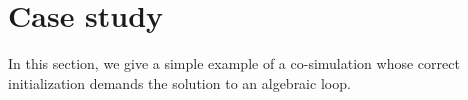 \section{Case study}
In this section, we give a simple example of a co-simulation whose correct initialization demands the solution to an algebraic loop.